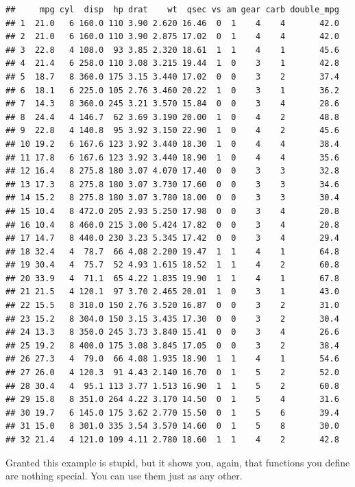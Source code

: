 \documentclass[]{gitbook}
\theoremstyle{definition}
\theoremstyle{definition}
\theoremstyle{definition}
\theoremstyle{remark}
\begin{document}
\begin{verbatim}
##     mpg cyl  disp  hp drat    wt  qsec vs am gear carb double_mpg
## 1  21.0   6 160.0 110 3.90 2.620 16.46  0  1    4    4       42.0
## 2  21.0   6 160.0 110 3.90 2.875 17.02  0  1    4    4       42.0
## 3  22.8   4 108.0  93 3.85 2.320 18.61  1  1    4    1       45.6
## 4  21.4   6 258.0 110 3.08 3.215 19.44  1  0    3    1       42.8
## 5  18.7   8 360.0 175 3.15 3.440 17.02  0  0    3    2       37.4
## 6  18.1   6 225.0 105 2.76 3.460 20.22  1  0    3    1       36.2
## 7  14.3   8 360.0 245 3.21 3.570 15.84  0  0    3    4       28.6
## 8  24.4   4 146.7  62 3.69 3.190 20.00  1  0    4    2       48.8
## 9  22.8   4 140.8  95 3.92 3.150 22.90  1  0    4    2       45.6
## 10 19.2   6 167.6 123 3.92 3.440 18.30  1  0    4    4       38.4
## 11 17.8   6 167.6 123 3.92 3.440 18.90  1  0    4    4       35.6
## 12 16.4   8 275.8 180 3.07 4.070 17.40  0  0    3    3       32.8
## 13 17.3   8 275.8 180 3.07 3.730 17.60  0  0    3    3       34.6
## 14 15.2   8 275.8 180 3.07 3.780 18.00  0  0    3    3       30.4
## 15 10.4   8 472.0 205 2.93 5.250 17.98  0  0    3    4       20.8
## 16 10.4   8 460.0 215 3.00 5.424 17.82  0  0    3    4       20.8
## 17 14.7   8 440.0 230 3.23 5.345 17.42  0  0    3    4       29.4
## 18 32.4   4  78.7  66 4.08 2.200 19.47  1  1    4    1       64.8
## 19 30.4   4  75.7  52 4.93 1.615 18.52  1  1    4    2       60.8
## 20 33.9   4  71.1  65 4.22 1.835 19.90  1  1    4    1       67.8
## 21 21.5   4 120.1  97 3.70 2.465 20.01  1  0    3    1       43.0
## 22 15.5   8 318.0 150 2.76 3.520 16.87  0  0    3    2       31.0
## 23 15.2   8 304.0 150 3.15 3.435 17.30  0  0    3    2       30.4
## 24 13.3   8 350.0 245 3.73 3.840 15.41  0  0    3    4       26.6
## 25 19.2   8 400.0 175 3.08 3.845 17.05  0  0    3    2       38.4
## 26 27.3   4  79.0  66 4.08 1.935 18.90  1  1    4    1       54.6
## 27 26.0   4 120.3  91 4.43 2.140 16.70  0  1    5    2       52.0
## 28 30.4   4  95.1 113 3.77 1.513 16.90  1  1    5    2       60.8
## 29 15.8   8 351.0 264 4.22 3.170 14.50  0  1    5    4       31.6
## 30 19.7   6 145.0 175 3.62 2.770 15.50  0  1    5    6       39.4
## 31 15.0   8 301.0 335 3.54 3.570 14.60  0  1    5    8       30.0
## 32 21.4   4 121.0 109 4.11 2.780 18.60  1  1    4    2       42.8
\end{verbatim}

Granted this example is stupid, but it shows you, again, that functions
you define are nothing special. You can use them just as any other.
\end{document}
